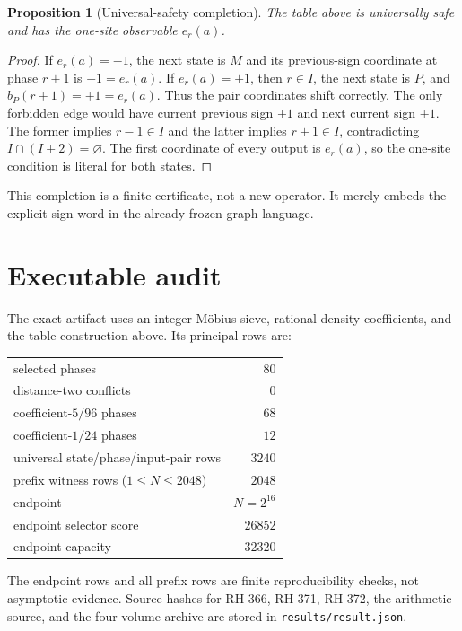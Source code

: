 \documentclass[11pt]{article}
\newtheorem{proposition}[theorem]{Proposition}
\theoremstyle{definition}
\theoremstyle{remark}
\begin{document}
\begin{proposition}[Universal-safety completion]
The table above is universally safe and has the one-site observable
$e_r(a)$.
\end{proposition}

\begin{proof}
If $e_r(a)=-1$, the next state is $M$ and its previous-sign coordinate at
phase $r+1$ is $-1=e_r(a)$.  If $e_r(a)=+1$, then $r\in I$, the next state is
$P$, and $b_P(r+1)=+1=e_r(a)$.  Thus the pair coordinates shift correctly.
The only forbidden edge would have current previous sign $+1$ and next
current sign $+1$.  The former implies $r-1\in I$ and the latter implies
$r+1\in I$, contradicting $I\cap(I+2)=\varnothing$.  The first coordinate
of every output is $e_r(a)$, so the one-site condition is literal for both
states.
\end{proof}

This completion is a finite certificate, not a new operator.  It merely
embeds the explicit sign word in the already frozen graph language.

\section{Executable audit}

The exact artifact uses an integer M\"obius sieve, rational density
coefficients, and the table construction above.  Its principal rows are:
\begin{center}
\begin{tabular}{@{}lr@{}}
\toprule
selected phases & $80$\\
distance-two conflicts & $0$\\
coefficient-$5/96$ phases & $68$\\
coefficient-$1/24$ phases & $12$\\
universal state/phase/input-pair rows & $3240$\\
prefix witness rows ($1\le N\le2048$) & $2048$\\
endpoint & $N=2^{16}$\\
endpoint selector score & $26852$\\
endpoint capacity & $32320$\\
\bottomrule
\end{tabular}
\end{center}
The endpoint rows and all prefix rows are finite reproducibility checks, not
asymptotic evidence.  Source hashes for RH-366, RH-371, RH-372, the arithmetic
source, and the four-volume archive are stored in
\texttt{results/result.json}.
\end{document}
